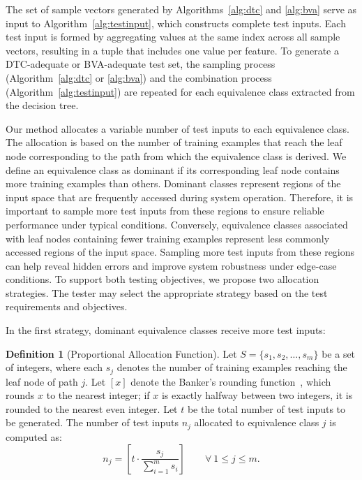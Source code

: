 \documentclass[
]{ceurart}
\theoremstyle{definition}
\newtheorem{definition}{Definition}[section]
\begin{document}
The set of sample vectors generated by Algorithms~\ref{alg:dtc} and \ref{alg:bva} serve as input to Algorithm~\ref{alg:testinput}, which constructs complete test inputs. Each test input is formed by aggregating values at the same index across all sample vectors, resulting in a tuple that includes one value per feature. To generate a DTC-adequate or BVA-adequate test set, the sampling process (Algorithm~\ref{alg:dtc} or \ref{alg:bva}) and the combination process (Algorithm~\ref{alg:testinput}) are repeated for each equivalence class extracted from the decision tree.

Our method allocates a variable number of test inputs to each equivalence class. The allocation is based on the number of training examples that reach the leaf node corresponding to the path from which the equivalence class is derived. We define an equivalence class as dominant if its corresponding leaf node contains more training examples than others. Dominant classes represent regions of the input space that are frequently accessed during system operation. Therefore, it is important to sample more test inputs from these regions to ensure reliable performance under typical conditions. Conversely, equivalence classes associated with leaf nodes containing fewer training examples represent less commonly accessed regions of the input space. Sampling more test inputs from these regions can help reveal hidden errors and improve system robustness under edge-case conditions. To support both testing objectives, we propose two allocation strategies. The tester may select the appropriate strategy based on the test requirements and objectives.

In the first strategy, dominant equivalence classes receive more test inputs:
\begin{definition}[Proportional Allocation Function]
\label{def:prop}
Let $S = \{s_1, s_2, \ldots, s_m\}$ be a set of integers, where each $s_j$ denotes the number of training examples reaching the leaf node of path $j$. Let $\left[ x \right]$ denote the Banker's rounding function~\cite{banker}, which rounds $x$ to the nearest integer; if $x$ is exactly halfway between two integers, it is rounded to the nearest even integer. Let $t$ be the total number of test inputs to be generated. The number of test inputs $n_j$ allocated to equivalence class $j$ is computed as:
\begin{equation*}
n_j = \left[ t \cdot \frac{s_j}{\sum_{i=1}^{m} s_i} \right] \qquad \forall\ 1 \leq j \leq m .
\end{equation*}
\end{definition}
\end{document}

